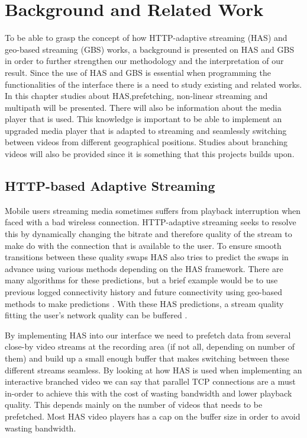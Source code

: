 \chapter{Background and Related Work}
\label{cha:theory}

To be able to grasp the concept of how HTTP-adaptive streaming (HAS) and geo-based streaming (GBS) works, a background is presented on HAS and GBS in order to further strengthen our methodology and the interpretation of our result. Since the use of HAS and GBS is essential when programming the functionalities of the interface there is a need to study existing and related works. In this chapter studies about HAS,prefetching, non-linear streaming and multipath will be presented. There will also be information about the media player that is used. This knowledge is important to be able to implement an upgraded media player that is adapted to streaming and seamlessly switching between videos from different geographical positions. Studies about branching videos will also be provided since it is something that this projects builds upon.

\section{HTTP-based Adaptive Streaming}
\label{sec:has}

Mobile users streaming media sometimes suffers from playback interruption when faced with a bad wireless connection. HTTP-adaptive streaming seeks to resolve this by dynamically changing the bitrate and therefore quality of the stream to make do with the connection that is available to the user. To ensure smooth transitions between these quality swaps HAS also tries to predict the swaps in advance using various methods depending on the HAS framework. There are many algorithms for these predictions, but a brief example would be to use previous logged connectivity history and future connectivity using geo-based methods to make predictions \cite{gtube}. With these HAS predictions, a stream quality fitting the user’s network quality can be buffered \cite{gtube}.

By implementing HAS into our interface we need to prefetch data from several close-by video streams at the recording area (if not all, depending on number of them) and build up a small enough buffer that makes switching between these different streams seamless. By looking at how HAS is used when implementing an interactive branched video we can say that parallel TCP connections are a must in-order to achieve this with the cost of wasting bandwidth and lower playback quality. This depends mainly on the number of videos that needs to be prefetched. Most HAS video players has a cap on the buffer size in order to avoid wasting bandwidth. 

